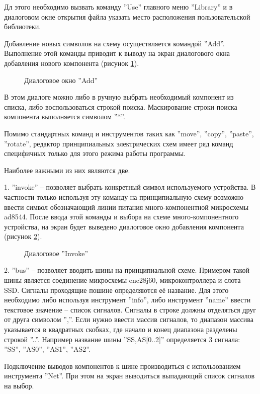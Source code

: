 Дл этого необходимо вызвать команду ''Use'' главного меню ''Library'' и в диалоговом окне открытия файла
указать место расположения пользовательской библиотеки.


Добавление новых символов на схему осуществляется командой ''Add''. Выполнение этой команды приводит к
выводу на экран диалогового окна добавления нового компонента (рисунок \ref{img:addDlg}).
\begin{figure}[ht]
	\caption{Диалоговое окно ''Add''}
	\label{img:addDlg}
\end{figure}

В этом диалоге можно либо в ручную выбрать необходимый компонент из списка, либо воспользоваться строкой поиска.
Маскирование строки поиска компонента выполняется символом ''*''.


Помимо стандартных команд и инструментов таких как ''move'', ''copy'', ''paste'', ''rotate'',
редактор принципиальных электрических схем имеет ряд команд специфичных только для этого
режима работы программы.

Наиболее важными из них являются две.
\begin{par}
 	1.	''invoke'' -- позволяет выбрать конкретный символ используемого устройства. В частности
	только используя эту команду на принципиальную схему возможно ввести символ обозначающий линии
	питания много-компонентной микросхемы ad8544. После ввода этой команды и выбора на схеме 
	много-компонентного устройства, на экран будет выведено диалоговое окно добавления компонента
	(рисунок \ref{img:addGateDlg}).
	
	\begin{figure}[ht]
		\caption{Диалоговое ''Invoke''}
		\label{img:addGateDlg}
	\end{figure}
\end{par}
	
\begin{par}
 	2.	''bus'' -- позволяет вводить шины на принципиальной схеме. Примером такой шины является
		соединение микросхемы enc28j60, микроконтроллера и слота SSD.
		Сигналы проходящие пошине определяются её название.
		Для этого необходимо либо используя инструмент ''info'', либо инструмент ''name'' ввести
		текстовое значение -- список сигналов. Сигналы в строке должны отделяться друг от друга
		символом '',''. Если нужно ввести массив сигналов, то диапазон массива указывается в
		квадратных скобках, где начало и конец диапазона разделены строкой ''..''. Например
		название шины ''SS,AS[0..2]'' определяется 3 сигнала: ''SS'', ''AS0'', ''AS1'', ''AS2''.
		
		Подключение выводов компонентов к шине производиться с использованием инструмента ''Net''.
		При этом на экран выводиться выпадающий список сигналов на выбор.
\end{par}


